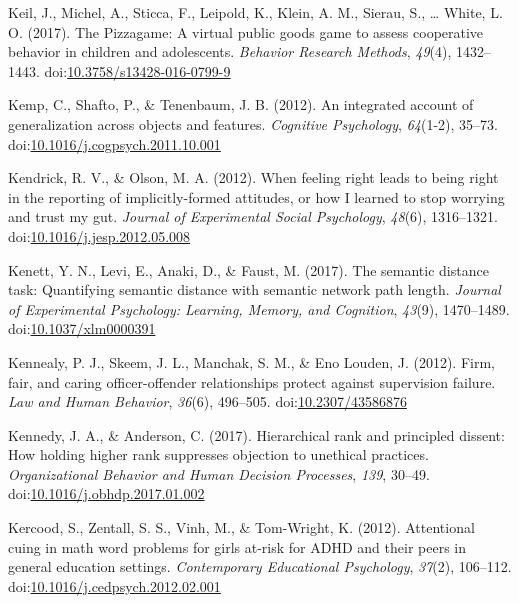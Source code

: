 \documentclass[english,man]{apa6}
\theoremstyle{definition}
\theoremstyle{definition}
\theoremstyle{definition}
\theoremstyle{remark}
\begin{document}
\hypertarget{ref-Keil2017}{}
Keil, J., Michel, A., Sticca, F., Leipold, K., Klein, A. M., Sierau, S.,
\ldots{} White, L. O. (2017). The Pizzagame: A virtual public goods game
to assess cooperative behavior in children and adolescents.
\emph{Behavior Research Methods}, \emph{49}(4), 1432--1443.
doi:\href{https://doi.org/10.3758/s13428-016-0799-9}{10.3758/s13428-016-0799-9}

\hypertarget{ref-Kemp2012}{}
Kemp, C., Shafto, P., \& Tenenbaum, J. B. (2012). An integrated account
of generalization across objects and features. \emph{Cognitive
Psychology}, \emph{64}(1-2), 35--73.
doi:\href{https://doi.org/10.1016/j.cogpsych.2011.10.001}{10.1016/j.cogpsych.2011.10.001}

\hypertarget{ref-Kendrick2012}{}
Kendrick, R. V., \& Olson, M. A. (2012). When feeling right leads to
being right in the reporting of implicitly-formed attitudes, or how I
learned to stop worrying and trust my gut. \emph{Journal of Experimental
Social Psychology}, \emph{48}(6), 1316--1321.
doi:\href{https://doi.org/10.1016/j.jesp.2012.05.008}{10.1016/j.jesp.2012.05.008}

\hypertarget{ref-Kenett2017}{}
Kenett, Y. N., Levi, E., Anaki, D., \& Faust, M. (2017). The semantic
distance task: Quantifying semantic distance with semantic network path
length. \emph{Journal of Experimental Psychology: Learning, Memory, and
Cognition}, \emph{43}(9), 1470--1489.
doi:\href{https://doi.org/10.1037/xlm0000391}{10.1037/xlm0000391}

\hypertarget{ref-Kennealy2012}{}
Kennealy, P. J., Skeem, J. L., Manchak, S. M., \& Eno Louden, J. (2012).
Firm, fair, and caring officer-offender relationships protect against
supervision failure. \emph{Law and Human Behavior}, \emph{36}(6),
496--505. doi:\href{https://doi.org/10.2307/43586876}{10.2307/43586876}

\hypertarget{ref-Kennedy2017}{}
Kennedy, J. A., \& Anderson, C. (2017). Hierarchical rank and principled
dissent: How holding higher rank suppresses objection to unethical
practices. \emph{Organizational Behavior and Human Decision Processes},
\emph{139}, 30--49.
doi:\href{https://doi.org/10.1016/j.obhdp.2017.01.002}{10.1016/j.obhdp.2017.01.002}

\hypertarget{ref-Kercood2012}{}
Kercood, S., Zentall, S. S., Vinh, M., \& Tom-Wright, K. (2012).
Attentional cuing in math word problems for girls at-risk for ADHD and
their peers in general education settings. \emph{Contemporary
Educational Psychology}, \emph{37}(2), 106--112.
doi:\href{https://doi.org/10.1016/j.cedpsych.2012.02.001}{10.1016/j.cedpsych.2012.02.001}
\end{document}
